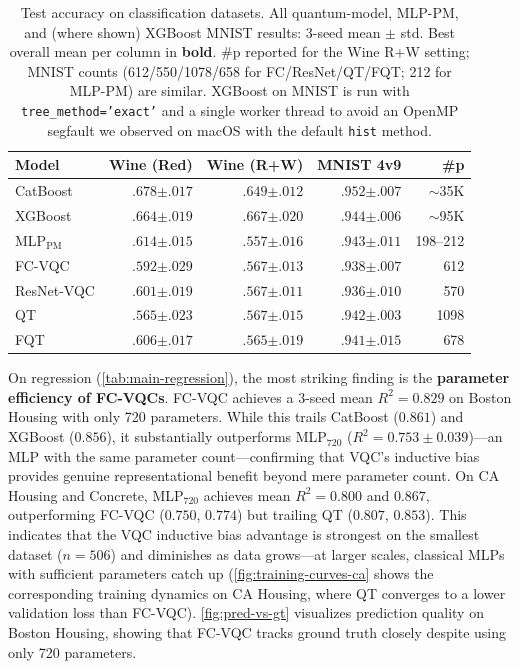 \documentclass[10pt,conference]{IEEEtran}
\begin{document}
\begin{table}[t]
\centering
\caption{Test accuracy on classification datasets. All quantum-model, MLP-PM, and (where shown) XGBoost MNIST results: 3-seed mean $\pm$ std. Best overall mean per column in \textbf{bold}. \#p reported for the Wine R+W setting; MNIST counts (612/550/1078/658 for FC/ResNet/QT/FQT; 212 for MLP-PM) are similar. XGBoost on MNIST is run with \texttt{tree\_method='exact'} and a single worker thread to avoid an OpenMP segfault we observed on macOS with the default \texttt{hist} method.}
\label{tab:main-classification}
\small
\begin{tabular}{lrrrr}
\toprule
Model & Wine (Red) & Wine (R+W) & MNIST 4v9 & \#p \\
\midrule
CatBoost & $\mathbf{.678}{\scriptstyle\pm.017}$ & $.649{\scriptstyle\pm.012}$ & $\mathbf{.952}{\scriptstyle\pm.007}$ & ${\sim}$35K \\
XGBoost & $.664{\scriptstyle\pm.019}$ & $\mathbf{.667}{\scriptstyle\pm.020}$ & $.944{\scriptstyle\pm.006}$ & ${\sim}$95K \\
\midrule
MLP$_{\text{PM}}$ & $.614{\scriptstyle\pm.015}$ & $.557{\scriptstyle\pm.016}$ & $.943{\scriptstyle\pm.011}$ & 198--212 \\
\midrule
FC-VQC & $.592{\scriptstyle\pm.029}$ & $.567{\scriptstyle\pm.013}$ & $.938{\scriptstyle\pm.007}$ & 612 \\
ResNet-VQC & $.601{\scriptstyle\pm.019}$ & $.567{\scriptstyle\pm.011}$ & $.936{\scriptstyle\pm.010}$ & 570 \\
QT & $.565{\scriptstyle\pm.023}$ & $.567{\scriptstyle\pm.015}$ & $.942{\scriptstyle\pm.003}$ & 1098 \\
FQT & $.606{\scriptstyle\pm.017}$ & $.565{\scriptstyle\pm.019}$ & $.941{\scriptstyle\pm.015}$ & 678 \\
\bottomrule
\end{tabular}
\vspace{-10pt}
\end{table}

On regression (\cref{tab:main-regression}), the most striking finding is the \textbf{parameter efficiency of FC-VQCs}.
FC-VQC achieves a 3-seed mean $R^2{=}0.829$ on Boston Housing with only 720 parameters.
While this trails CatBoost ($0.861$) and XGBoost ($0.856$), it substantially outperforms MLP$_{720}$ ($R^2{=}0.753 \pm 0.039$)---an MLP with the same parameter count---confirming that VQC's inductive bias provides genuine representational benefit beyond mere parameter count.
On CA Housing and Concrete, MLP$_{720}$ achieves mean $R^2{=}0.800$ and $0.867$, outperforming FC-VQC ($0.750$, $0.774$) but trailing QT ($0.807$, $0.853$).
This indicates that the VQC inductive bias advantage is strongest on the smallest dataset ($n{=}506$) and diminishes as data grows---at larger scales, classical MLPs with sufficient parameters catch up (\cref{fig:training-curves-ca} shows the corresponding training dynamics on CA Housing, where QT converges to a lower validation loss than FC-VQC).
\cref{fig:pred-vs-gt} visualizes prediction quality on Boston Housing, showing that FC-VQC tracks ground truth closely despite using only 720 parameters.
\end{document}
